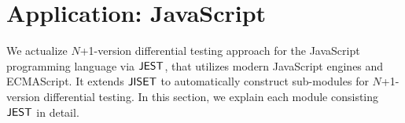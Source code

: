 \section{Application: JavaScript}\label{sec:application}

We actualize $N$+1-version differential testing approach for the JavaScript programming
language via $\text{\sf JEST}$, that utilizes modern JavaScript engines and ECMAScript.
It extends $\text{\sf JISET}$ to automatically construct sub-modules for $N$+1-version differential
testing.  In this section, we explain each module consisting $\text{\sf JEST}$ in detail.






